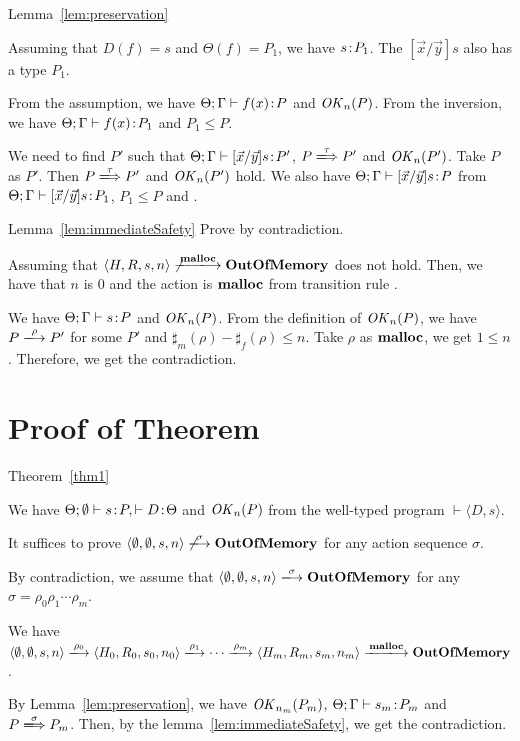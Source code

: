 \begin{pfof}{Lemma~\ref{lem:preservation}}
\begin{itemize}
  Assuming that \(D(f) = s\) and \(\Theta(f) = P_1\), we have \(s\!:\!
  P_1\). The \([\vec{x}/\vec{y}]s\) also has a type \(P_1\).

  From the assumption, we have \(\Theta;\Gamma \vdash f(x)\!:\! P\) and
  \(\mathit{OK}_n(P)\). From the inversion, we have \(\Theta;\Gamma \vdash
  f(x)\!:\! P_1\) and \(P_1 \le P\).

  We need to find \(P'\) such that \(\Theta;\Gamma \vdash [\vec{x}/\vec{y}]s\!:\!
  P'\), \(P \xLongrightarrow{\tau} P'\) and \(\mathit{OK}_n(P')\). Take \(P\) as
  \(P'\). Then \(P \xLongrightarrow{\tau} P'\) and \(\mathit{OK}_n(P')\) hold. We
  also have \(\Theta;\Gamma \vdash [\vec{x}/\vec{y}]s\!:\! P \) from
  \(\Theta;\Gamma \vdash [\vec{x}/\vec{y}]s\!:\! P_1\), \(P_1 \le P\) and
  .

\end{itemize}

\end{pfof}


\begin{pfof}{Lemma~\ref{lem:immediateSafety}}
Prove by contradiction.

Assuming that \(\langle H, R, s, n \rangle
\not\xlongrightarrow{\Malloc} \OVERFLOW \) does not hold. Then, we
have that \(n\) is \(0\) and the action is \(\mathbf{malloc}\) from transition rule
.

We have \(\Theta;\Gamma \vdash s \!:\! P\) and \(\mathit{OK}_n(P)\). From the
definition of \(\mathit{OK}_n(P)\), we have \(P \xlongrightarrow{\rho} P'\)
for some \(P'\) and \(\sharp_m(\rho) - \sharp_f(\rho) \le n \). Take
\(\rho\) as \(\mathbf{malloc}\), we get \( 1 \le n \). Therefore, we get the
contradiction.

\end{pfof}


\section{Proof of Theorem}

\begin{pfof}{Theorem~\ref{thm1}}


We have \( \Theta;\emptyset \vdash s\!:\! P, \vdash D\!:\! \Theta\) and
\(\mathit{OK}_n(P)\) from the well-typed program \(\vdash \langle D,
s\rangle\).

It suffices to prove \( \langle \emptyset, \emptyset, s, n\rangle
\not\xlongrightarrow{\sigma} \OVERFLOW\) for any action sequence
\(\sigma\).

By contradiction, we assume that \( \langle \emptyset, \emptyset,
s, n\rangle \xlongrightarrow{\sigma} \OVERFLOW \) for any \(\sigma =
\rho_0\rho_1\cdots\rho_m\).

We have \( \langle \emptyset, \emptyset, s, n\rangle
\xlongrightarrow{\rho_0} \langle H_0, R_0, s_0, n_0\rangle
\xlongrightarrow{\rho_1} \cdots \xlongrightarrow{\rho_m} \langle H_m,
R_m, s_m, n_m \rangle \xlongrightarrow{\Malloc} \OVERFLOW \).

By Lemma~\ref{lem:preservation}, we have \(\mathit{OK}_{n_m}(P_m)\),
\(\Theta;\Gamma\vdash s_m \!:\! P_m\) and \(P \xLongrightarrow{\sigma}
P_m\). Then, by the lemma~\ref{lem:immediateSafety}, we get the
contradiction.

\end{pfof}
